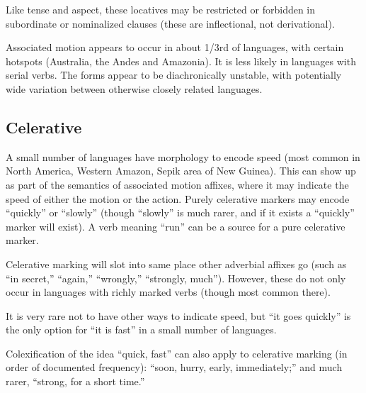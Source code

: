 \documentclass[11pt]{article}
\begin{document}
{Like tense and aspect, these locatives may be restricted or forbidden
in subordinate or nominalized clauses (these are inflectional, not
derivational). 

Associated motion appears to occur in about 1/3rd of languages, with
certain hotspots (Australia, the Andes and Amazonia).  It is less
likely in languages with serial verbs.  The forms appear to be
diachronically unstable, with potentially wide variation between
otherwise closely related languages.


\subsection{Celerative}
A small number of languages have morphology to encode speed (most
common in North America, Western Amazon, Sepik area of New Guinea).
This can show up as part of the semantics of associated motion
affixes, where it may indicate the speed of either the motion or the
action.  Purely celerative markers may encode ``quickly'' or
``slowly'' (though ``slowly'' is much rarer, and if it exists a
``quickly'' marker will exist).  A verb meaning ``run'' can be a
source for a pure celerative marker.

Celerative marking will slot into same place other adverbial affixes
go (such as ``in secret,'' ``again,'' ``wrongly,'' ``strongly,
much'').  However, these do not only occur in languages with richly
marked verbs (though most common there).

It is very rare not to have other ways to indicate speed, but ``it
goes quickly'' is the only option for ``it is fast'' in a small number
of languages.

Colexification of the idea ``quick, fast'' can also apply to
celerative marking (in order of documented frequency): ``soon, hurry,
early, immediately;'' and much rarer, ``strong, for a short time.''


}
\end{document}
